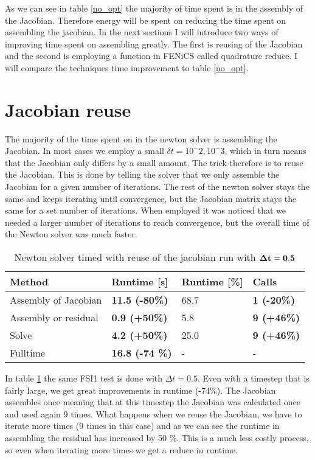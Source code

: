 As we can see in table \ref{no_opt} the majority of time spent is in the assembly of the Jacobian. Therefore energy will be spent on reducing the time spent on assembling the jacobian. In the next sections I will introduce two ways of improving time spent on assembling greatly. The first is reusing of the Jacobian and the second is employing a function in FENiCS called quadrature reduce. I will compare the techniques time improvement to table \ref{no_opt}.

\section{Jacobian reuse }
 The majority of the time spent on in the newton solver is assembling the Jacobian. In most cases we employ a small $\delta t = 10^-2, 10^-3$, which in turn means that the Jacobian only differs by a small amount. The trick therefore is to reuse the Jacobian. This is done by telling the solver that we only assemble the Jacobian for a given number of iterations. The rest of the newton solver stays the same and keeps iterating until convergence, but the Jacobian matrix stays the same for a set number of iterations. When employed it was noticed that we needed a larger number of iterations to reach convergence, but the overall time of the Newton solver was much faster.\newline

\begin{table}[H]
\centering
\caption{Newton solver timed with reuse of the jacobian run with $\bold{\Delta t = 0.5}$}
\label{jac_reuse}
\begin{tabular}{|l|l|l|l|}
\hline
Method & \textbf{Runtime {[}s{]}} & Runtime {[}\%{]} & \textbf{Calls} \\ \hline
Assembly of Jacobian & \textbf{11.5 (-80\%)} & 68.7 & \textbf{1 (-20\%)} \\ \hline
Assembly or residual & \textbf{0.9 (+50\%)} & 5.8 & \textbf{9 (+46\%)} \\ \hline
Solve & \textbf{4.2 (+50\%)} & 25.0 & \textbf{9 (+46\%)} \\ \hline
Fulltime & \textbf{16.8 (-74 \%)} & - & - \\ \hline
\end{tabular}
\end{table}

In table \ref{jac_reuse} the same FSI1 test is done with $\Delta t = 0.5$. Even with a timestep that is fairly large, we get great improvements in runtime (-74\%). The Jacobian assembles once meaning that at this timestep the Jacobian was calculated once and used again 9 times. What happens when we reuse the Jacobian, we have to iterate more times (9 times in this case) and as we can see the runtime in assembling the residual has increased by 50 \%. This is a much less costly process, so even when iterating more times we get a reduce in runtime.


